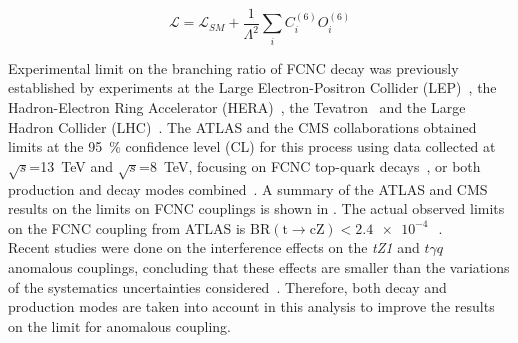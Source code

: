\begin{equation}
\mathcal{L} = \mathcal{L}_{SM} + \frac{1}{\Lambda^2}\sum_{i} C_{i}^{(6)} O_{i}^{(6)}  
\label{eq:lagrangian}
\end{equation}

\noindent Experimental limit on the branching ratio of FCNC \tZc decay was previously established by experiments at the Large Electron-Positron Collider (LEP)~\cite{ALEPH,DELPHI,OPAL,L3}, the Hadron-Electron Ring Accelerator (HERA)~\cite{ZEUS}, the Tevatron\ \cite{CDF,DZero} and the Large Hadron Collider (LHC)~\cite{TOPQ-2017-06,Chatrchyan:2013nwa,CMS-TOP-12-039}. The ATLAS and the CMS collaborations obtained limits at the \SI{95}{\percent} confidence level (CL) for this process using data collected at $\sqrt{s}$=\SI{13}{\TeV} and $\sqrt{s}$=\SI{8}{\TeV}, focusing on FCNC top-quark decays~\cite{TOPQ-2017-06,Chatrchyan:2013nwa}, or both production and decay modes combined~\cite{CMS-TOP-12-039}. 
A summary of the ATLAS and CMS results on the limits on FCNC couplings is shown in . The actual observed limits on the FCNC \tZc coupling from ATLAS is $\mathrm{BR(t\to cZ) < \SI{2.4e-4}{}}$~\cite{TOPQ-2017-06}.\\
Recent studies were done on the interference effects on the \textit{tZ1} and $t\gamma q$ anomalous couplings, concluding that these effects are smaller than the variations of the systematics uncertainties considered~\cite{Interference}. Therefore, both decay and production modes are taken into account in this analysis to improve the results on the limit for \tZc anomalous coupling.

